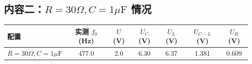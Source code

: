 \documentclass{article}
\begin{document}
\renewcommand{\arraystretch}{1}

\newpage

\subsection{内容二：$R=30\Omega, C=1\mu\text{F}$ 情况}


\begin{table}[H]
\centering
\begin{tabular}{|l|c|c|c|c|c|c|}
\hline
配置 & 实测 $f_0$ (Hz) & $U$ (V) & $U_C$ (V) & $U_L$ (V) & $U_{C-L}$ (V) & $U_{R}$ (V) \\ \hline
$R=30\Omega, C=1\mu\text{F}$  & 477.0 & 2.0 & 6.30  & 6.37&1.381 &0.609 \\ \hline
\end{tabular}
\end{table}

\renewcommand{\arraystretch}{1.5} 
\end{document}
